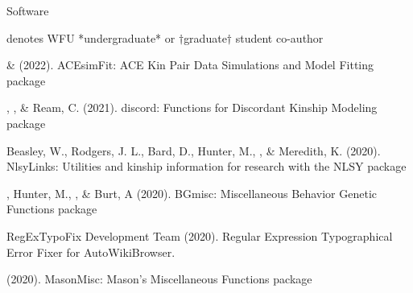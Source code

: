 \begin{rSection}{\textrm{Software}}%
\vspace{-1mm}\begin{center}\footnotesize{denotes WFU *undergraduate* or $\dagger$graduate$\dagger$ student co-author}\end{center}\vspace{-1mm}

\begin{etaremune}
\item \xyl  \& \meb (2022). ACEsimFit: ACE Kin Pair Data Simulations and Model Fitting \R package 
\item\meb, \jt, \& Ream, C. (2021). discord: Functions for Discordant Kinship Modeling \R package 
%
%
%
\item  Beasley, W., Rodgers, J. L., Bard, D., Hunter, M., \meb, \& Meredith, K. (2020). NlsyLinks: Utilities and kinship information for research with the NLSY \R package %
%
%
\item\meb, Hunter, M., \jt, \& Burt, A (2020). BGmisc: Miscellaneous Behavior Genetic Functions \R package %

\item RegExTypoFix Development Team (2020). Regular Expression Typographical Error Fixer for Auto\allowbreak WikiBrowser. 
%
\item\meb (2020). MasonMisc: Mason's Miscellaneous Functions \R package 
%
%
\end{etaremune}
\end{rSection}

